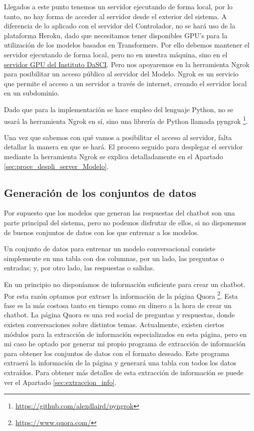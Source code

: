 Llegados a este punto tenemos un servidor ejecutando de forma local, por lo tanto, no hay forma de acceder al servidor desde el exterior del sistema. A diferencia de lo aplicado con el servidor del Controlador, no se hará uso de la plataforma Heroku, dado que necesitamos tener disponibles GPU's para la utilización de los modelos basados en Transformers. Por ello debemos mantener el servidor ejecutando de forma local, pero no en nuestra máquina, sino en el \href{https://dasci.es/es/sobre-dasci/recursos/recursos-tecnologicos/}{servidor GPU del Instituto DaSCI}. Pero nos apoyaremos en la herramienta Ngrok para posibilitar un acceso público al servidor del Modelo. Ngrok es un servicio que permite el acceso a un servidor a través de internet, creando el servidor local en un subdominio.

Dado que para la implementación se hace empleo del lenguaje Python, no se usará la herramienta Ngrok en sí, sino una librería de Python llamada pyngrok \footnote{\url{https://github.com/alexdlaird/pyngrok}}.

Una vez que sabemos con qué vamos a posibilitar el acceso al servidor, falta detallar la manera en que se hará. El proceso seguido para desplegar el servidor mediante la herramienta Ngrok se explica detalladamente en el Apartado \ref{sec:proce_despli_server_Modelo}.

\subsection{Generación de los conjuntos de datos}

Por supuesto que los modelos que generan las respuestas del chatbot son una parte principal del sistema, pero no podemos disfrutar de ellos, si no disponemos de buenos conjuntos de datos con los que entrenar a los modelos.

Un conjunto de datos para entrenar un modelo conversacional consiste simplemente en una tabla con dos columnas, por un lado, las preguntas o entradas; y, por otro lado, las respuestas o salidas.

En un principio no disponíamos de información suficiente para crear un chatbot. Por esta razón optamos por extraer la información de la página Quora \footnote{\url{https://www.quora.com/}}. Esta fase es la más costosa tanto en tiempo como en dinero a la hora de crear un chatbot. La página Quora es una red social de preguntas y respuestas, donde existen conversaciones sobre distintos temas. Actualmente, existen ciertos módulos para la extracción de información especializados en esta página, pero en mi caso he optado por generar mi propio programa de extracción de información para obtener los conjuntos de datos con el formato deseado. Este programa extraerá la información de la página y generará una tabla con todos los datos extraídos. Para obtener más detalles de esta extracción de información se puede ver el Apartado \ref{sec:extraccion_info}.

